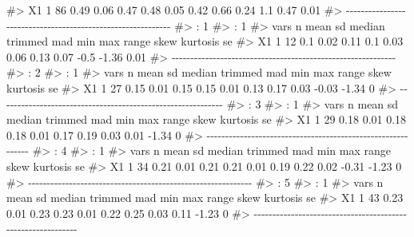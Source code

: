\documentclass[
  10pt,
  a4paper,
]{book}
\newenvironment{Shaded}{\begin{snugshade}}{\end{snugshade}}
\newcommand{\CommentTok}[1]{\textcolor[rgb]{0.37,0.37,0.37}{#1}}
\begin{document}
\begin{Shaded}
\begin{Highlighting}[]
\CommentTok{\#\textgreater{} X1    1 86 0.49 0.06   0.47    0.48 0.05 0.42 0.66  0.24  1.1     0.47 0.01}
\CommentTok{\#\textgreater{} {-}{-}{-}{-}{-}{-}{-}{-}{-}{-}{-}{-}{-}{-}{-}{-}{-}{-}{-}{-}{-}{-}{-}{-}{-}{-}{-}{-}{-}{-}{-}{-}{-}{-}{-}{-}{-}{-}{-}{-}{-}{-}{-}{-}{-}{-}{-}{-}{-}{-}{-}{-}{-}{-}{-}{-}{-}{-}{-}{-} }
\CommentTok{\#\textgreater{} : 1}
\CommentTok{\#\textgreater{} : 1}
\CommentTok{\#\textgreater{}    vars  n mean   sd median trimmed  mad  min  max range skew kurtosis   se}
\CommentTok{\#\textgreater{} X1    1 12  0.1 0.02   0.11     0.1 0.03 0.06 0.13  0.07 {-}0.5    {-}1.36 0.01}
\CommentTok{\#\textgreater{} {-}{-}{-}{-}{-}{-}{-}{-}{-}{-}{-}{-}{-}{-}{-}{-}{-}{-}{-}{-}{-}{-}{-}{-}{-}{-}{-}{-}{-}{-}{-}{-}{-}{-}{-}{-}{-}{-}{-}{-}{-}{-}{-}{-}{-}{-}{-}{-}{-}{-}{-}{-}{-}{-}{-}{-}{-}{-}{-}{-} }
\CommentTok{\#\textgreater{} : 2}
\CommentTok{\#\textgreater{} : 1}
\CommentTok{\#\textgreater{}    vars  n mean   sd median trimmed  mad  min  max range  skew kurtosis se}
\CommentTok{\#\textgreater{} X1    1 27 0.15 0.01   0.15    0.15 0.01 0.13 0.17  0.03 {-}0.03    {-}1.34  0}
\CommentTok{\#\textgreater{} {-}{-}{-}{-}{-}{-}{-}{-}{-}{-}{-}{-}{-}{-}{-}{-}{-}{-}{-}{-}{-}{-}{-}{-}{-}{-}{-}{-}{-}{-}{-}{-}{-}{-}{-}{-}{-}{-}{-}{-}{-}{-}{-}{-}{-}{-}{-}{-}{-}{-}{-}{-}{-}{-}{-}{-}{-}{-}{-}{-} }
\CommentTok{\#\textgreater{} : 3}
\CommentTok{\#\textgreater{} : 1}
\CommentTok{\#\textgreater{}    vars  n mean   sd median trimmed  mad  min  max range skew kurtosis se}
\CommentTok{\#\textgreater{} X1    1 29 0.18 0.01   0.18    0.18 0.01 0.17 0.19  0.03 0.01    {-}1.34  0}
\CommentTok{\#\textgreater{} {-}{-}{-}{-}{-}{-}{-}{-}{-}{-}{-}{-}{-}{-}{-}{-}{-}{-}{-}{-}{-}{-}{-}{-}{-}{-}{-}{-}{-}{-}{-}{-}{-}{-}{-}{-}{-}{-}{-}{-}{-}{-}{-}{-}{-}{-}{-}{-}{-}{-}{-}{-}{-}{-}{-}{-}{-}{-}{-}{-} }
\CommentTok{\#\textgreater{} : 4}
\CommentTok{\#\textgreater{} : 1}
\CommentTok{\#\textgreater{}    vars  n mean   sd median trimmed  mad  min  max range  skew kurtosis se}
\CommentTok{\#\textgreater{} X1    1 34 0.21 0.01   0.21    0.21 0.01 0.19 0.22  0.02 {-}0.31    {-}1.23  0}
\CommentTok{\#\textgreater{} {-}{-}{-}{-}{-}{-}{-}{-}{-}{-}{-}{-}{-}{-}{-}{-}{-}{-}{-}{-}{-}{-}{-}{-}{-}{-}{-}{-}{-}{-}{-}{-}{-}{-}{-}{-}{-}{-}{-}{-}{-}{-}{-}{-}{-}{-}{-}{-}{-}{-}{-}{-}{-}{-}{-}{-}{-}{-}{-}{-} }
\CommentTok{\#\textgreater{} : 5}
\CommentTok{\#\textgreater{} : 1}
\CommentTok{\#\textgreater{}    vars  n mean   sd median trimmed  mad  min  max range skew kurtosis se}
\CommentTok{\#\textgreater{} X1    1 43 0.23 0.01   0.23    0.23 0.01 0.22 0.25  0.03 0.11    {-}1.23  0}
\CommentTok{\#\textgreater{} {-}{-}{-}{-}{-}{-}{-}{-}{-}{-}{-}{-}{-}{-}{-}{-}{-}{-}{-}{-}{-}{-}{-}{-}{-}{-}{-}{-}{-}{-}{-}{-}{-}{-}{-}{-}{-}{-}{-}{-}{-}{-}{-}{-}{-}{-}{-}{-}{-}{-}{-}{-}{-}{-}{-}{-}{-}{-}{-}{-} }

\end{Highlighting}
\end{Shaded}
\end{document}
